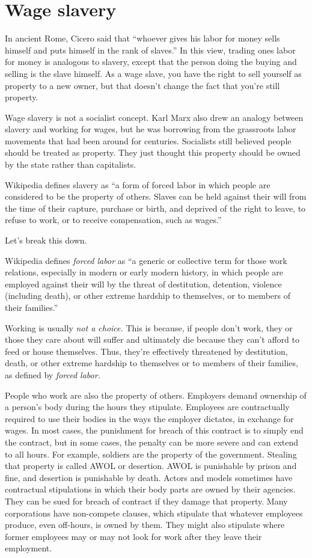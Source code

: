 \section{Wage slavery}
In ancient Rome, Cicero said that ``whoever gives his labor for money sells himself and puts himself in the rank of slaves.'' In this view, trading ones labor for money is analogous to slavery, except that the person doing the buying and selling is the slave himself. As a wage slave, you have the right to sell yourself as property to a new owner, but that doesn't change the fact that you're still property.

Wage slavery is not a socialist concept. Karl Marx also drew an analogy between slavery and working for wages, but he was borrowing from the grassroots labor movements that had been around for centuries. Socialists still believed people should be treated as property. They just thought this property should be owned by the state rather than capitalists.

Wikipedia defines slavery as ``a form of forced labor in which people are considered to be the property of others. Slaves can be held against their will from the time of their capture, purchase or birth, and deprived of the right to leave, to refuse to work, or to receive compensation, such as wages.''\cite{wikipedia-slavery}

Let's break this down.

Wikipedia defines \emph{forced labor} as ``a generic or collective term for those work relations, especially in modern or early modern history, in which people are employed against their will by the threat of destitution, detention, violence (including death), or other extreme hardship to themselves, or to members of their families.''\cite{wikipedia-forced-labor}

Working is usually \emph{not a choice.} This is because, if people don't work, they or those they care about will suffer and ultimately die because they can't afford to feed or house themselves. Thus, they're effectively threatened by destitution, death, or other extreme hardship to themselves or to members of their families, as defined by \emph{forced labor.}

People who work are also the property of others. Employers demand ownership of a person's body during the hours they stipulate. Employees are contractually required to use their bodies in the ways the employer dictates, in exchange for wages. In most cases, the punishment for breach of this contract is to simply end the contract, but in some cases, the penalty can be more severe and can extend to all hours. For example, soldiers are the property of the government. Stealing that property is called AWOL or desertion. AWOL is punishable by prison and fine, and desertion is punishable by death. Actors and models sometimes have contractual stipulations in which their body parts are owned by their agencies. They can be sued for breach of contract if they damage that property. Many corporations have non-compete clauses, which stipulate that whatever employees produce, even off-hours, is owned by them. They might also stipulate where former employees may or may not look for work after they leave their employment.

